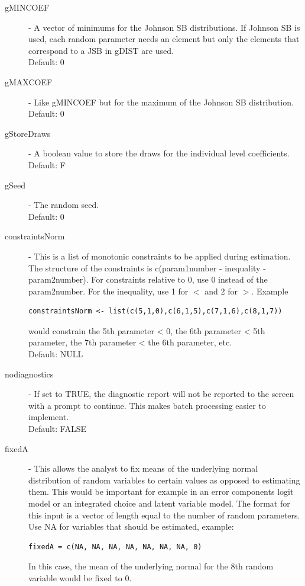 \documentclass{article}\usepackage[]{graphicx}\usepackage[]{color}
\begin{document}
\begin{description}
\item[gMINCOEF] - A vector of minimums for the Johnson SB distributions. If Johnson SB is used, each random parameter needs an element but only the elements that correspond to a JSB in gDIST are used. \\ 
Default: 0

\item[gMAXCOEF] - Like gMINCOEF but for the maximum of the Johnson SB distribution. 
\\ Default: 0

\item[gStoreDraws] - A boolean value to store the draws for the individual level coefficients. \\ Default: F

\item[gSeed] - The random seed.\\ 
Default: 0

\item[constraintsNorm] - This is a list of monotonic constraints to be applied during estimation. The structure of the constraints is c(param1number - inequality - param2number). For constraints relative to 0, use 0 instead of the param2number. For the inequality, use 1 for $<$ and 2 for $>$. Example \begin{verbatim}constraintsNorm <- list(c(5,1,0),c(6,1,5),c(7,1,6),c(8,1,7))\end{verbatim} would constrain the 5th parameter < 0, the 6th parameter < 5th parameter, the 7th parameter < the 6th parameter, etc. \\ Default: NULL

\item[nodiagnostics] - If set to TRUE, the diagnostic report will not be reported to the screen with a prompt to continue. This makes batch processing easier to implement.\\ 
Default: FALSE

\item[fixedA] - This allows the analyst to fix means of the underlying normal distribution of random variables to certain values as opposed to estimating them. This would be important for example in an error components logit model or an integrated choice and latent variable model. The format for this input is a vector of length equal to the number of random parameters. Use NA for variables that should be estimated, example: \begin{verbatim}fixedA = c(NA, NA, NA, NA, NA, NA, NA, 0)\end{verbatim} In this case, the mean of the underlying normal for the 8th random variable would be fixed to 0.


\end{description}
\end{document}
